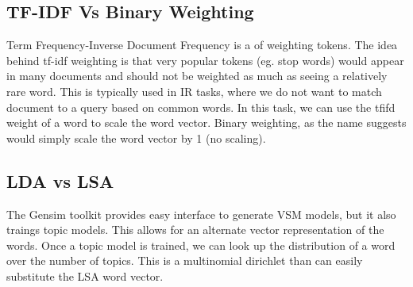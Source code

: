 \documentclass[11pt]{article}
\begin{document}
\subsection{TF-IDF Vs Binary Weighting}
Term Frequency-Inverse Document Frequency is a of weighting tokens. The idea
behind tf-idf weighting is that very popular tokens (eg. stop words) would
appear in many documents and should not be weighted as much as seeing a
relatively rare word. This is typically used in IR tasks, where we do not want
to match document to a query based on common words. In this task, we can use the
tfifd weight of a word to scale the word vector. Binary weighting, as the name
suggests would simply scale the word vector by 1 (no scaling).
\subsection{LDA vs LSA}
The Gensim toolkit provides easy interface to generate VSM models, but it also
traings topic models. This allows for an alternate vector representation of the
words. Once a topic model is trained, we can look up the distribution of a word
over the number of topics. This is a multinomial dirichlet than can  easily
substitute the LSA word vector.
\end{document}
